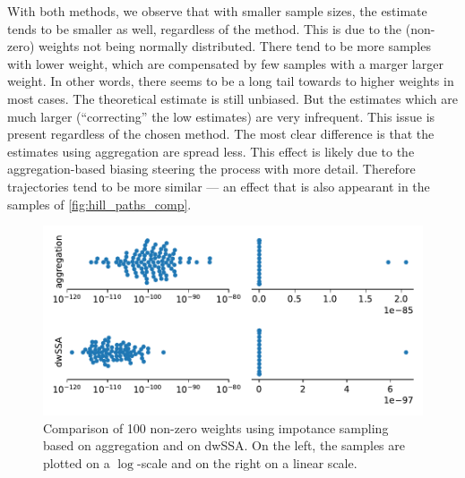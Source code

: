 With both methods, we observe that with smaller sample sizes, the estimate tends to be smaller as well, regardless of the method.
This is due to the (non-zero) weights not being normally distributed.
There tend to be more samples with lower weight, which are compensated by few samples with a marger larger weight.
In other words, there seems to be a long tail towards to higher weights in most cases.
The theoretical estimate is still unbiased.
But the estimates which are much larger (``correcting'' the low estimates) are very infrequent.
This issue is present regardless of the chosen method.
The most clear difference is that the estimates using aggregation are spread less.
This effect is likely due to the aggregation-based biasing steering the process with more detail.
Therefore trajectories tend to be more similar --- an effect that is also appearant in the samples of \autoref{fig:hill_paths_comp}.
\begin{figure}[htb]
    \centering
    \includegraphics[scale=.55]{gfx/weights.pdf}
    \caption[Weight distribution of different \ac{IS} methods]{\label{fig:rare:weights}Comparison of \num{100} non-zero weights using impotance sampling based on aggregation and on dwSSA. On the left, the samples are plotted on a $\log$-scale and on the right on a linear scale.}
\end{figure}

